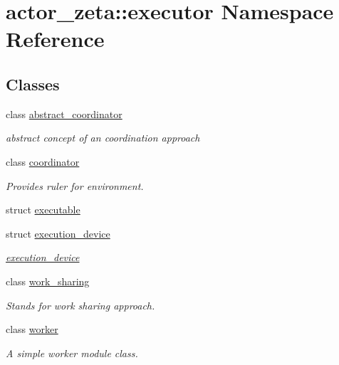 \hypertarget{namespaceactor__zeta_1_1executor}{}\section{actor\+\_\+zeta\+:\+:executor Namespace Reference}
\label{namespaceactor__zeta_1_1executor}
\subsection*{Classes}
\begin{DoxyCompactItemize}
\item 
class \hyperlink{classactor__zeta_1_1executor_1_1abstract__coordinator}{abstract\+\_\+coordinator}
\begin{DoxyCompactList}\small\item\em abstract concept of an coordination approach \end{DoxyCompactList}\item 
class \hyperlink{classactor__zeta_1_1executor_1_1coordinator}{coordinator}
\begin{DoxyCompactList}\small\item\em Provides ruler for environment. \end{DoxyCompactList}\item 
struct \hyperlink{structactor__zeta_1_1executor_1_1executable}{executable}
\item 
struct \hyperlink{structactor__zeta_1_1executor_1_1execution__device}{execution\+\_\+device}
\begin{DoxyCompactList}\small\item\em \hyperlink{structactor__zeta_1_1executor_1_1execution__device}{execution\+\_\+device} \end{DoxyCompactList}\item 
class \hyperlink{classactor__zeta_1_1executor_1_1work__sharing}{work\+\_\+sharing}
\begin{DoxyCompactList}\small\item\em Stands for work sharing approach. \end{DoxyCompactList}\item 
class \hyperlink{classactor__zeta_1_1executor_1_1worker}{worker}
\begin{DoxyCompactList}\small\item\em A simple worker module class. \end{DoxyCompactList}\end{DoxyCompactItemize}
